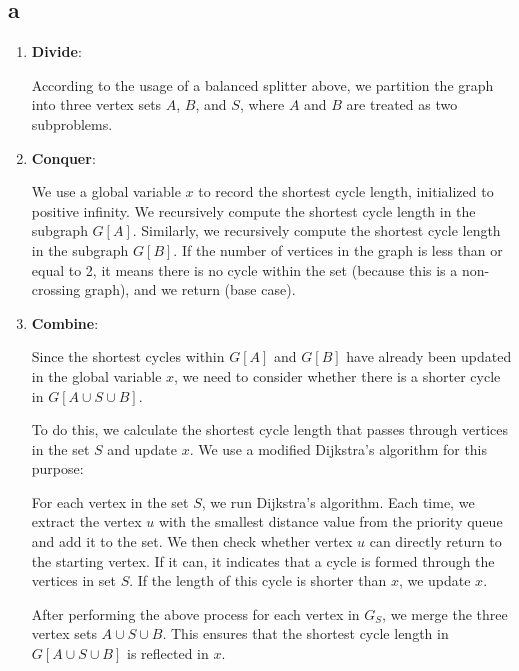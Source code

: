\documentclass[12pt]{article}
\begin{document}
    \subsection*{a}
        \begin{enumerate}

            \item \textbf{Divide}:

            According to the usage of a balanced splitter above, we partition the graph into three vertex sets \(A\), \(B\), and \(S\), where \(A\) and \(B\) are treated as two subproblems.

            \item \textbf{Conquer}:

            We use a global variable \(x\) to record the shortest cycle length, initialized to positive infinity. We recursively compute the shortest cycle length in the subgraph \(G[A]\). Similarly, we recursively compute the shortest cycle length in the subgraph \(G[B]\). If the number of vertices in the graph is less than or equal to 2, it means there is no cycle within the set (because this is a non-crossing graph), and we return (base case).

            \item \textbf{Combine}:

            Since the shortest cycles within \(G[A]\) and \(G[B]\) have already been updated in the global variable \(x\), we need to consider whether there is a shorter cycle in \(G[A \cup S \cup B]\).

            To do this, we calculate the shortest cycle length that passes through vertices in the set \(S\)  and update \(x\). We use a modified Dijkstra's algorithm for this purpose:

            For each vertex in the set \(S\), we run Dijkstra's algorithm. Each time, we extract the vertex \(u\) with the smallest distance value from the priority queue and add it to the set. We then check whether vertex \(u\) can directly return to the starting vertex. If it can, it indicates that a cycle is formed through the vertices in set \(S\). If the length of this cycle is shorter than \(x\), we update \(x\).

            After performing the above process for each vertex in \(G_S\), we merge the three vertex sets \(A \cup S \cup B\). This ensures that the shortest cycle length in \(G[A \cup S \cup B]\) is reflected in \(x\).

        \end{enumerate}
\end{document}
